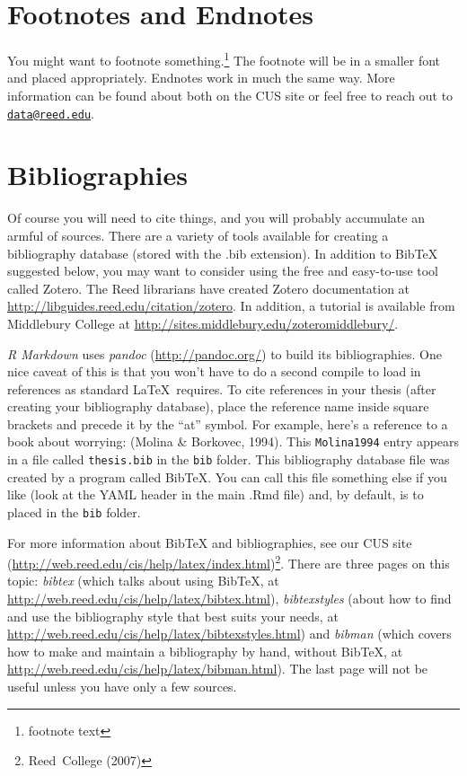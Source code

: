 \documentclass[12pt,twoside]{reedthesis}
\begin{document}
  \section{Footnotes and Endnotes}\label{footnotes-and-endnotes-2}
  
  You might want to footnote something.\footnote{footnote text} The
  footnote will be in a smaller font and placed appropriately. Endnotes
  work in much the same way. More information can be found about both on
  the CUS site or feel free to reach out to
  \href{mailto:data@reed.edu}{\nolinkurl{data@reed.edu}}.
  
  \section{Bibliographies}\label{bibliographies-2}
  
  Of course you will need to cite things, and you will probably accumulate
  an armful of sources. There are a variety of tools available for
  creating a bibliography database (stored with the .bib extension). In
  addition to BibTeX suggested below, you may want to consider using the
  free and easy-to-use tool called Zotero. The Reed librarians have
  created Zotero documentation at
  \url{http://libguides.reed.edu/citation/zotero}. In addition, a tutorial
  is available from Middlebury College at
  \url{http://sites.middlebury.edu/zoteromiddlebury/}.
  
  \emph{R Markdown} uses \emph{pandoc} (\url{http://pandoc.org/}) to build
  its bibliographies. One nice caveat of this is that you won't have to do
  a second compile to load in references as standard \LaTeX~requires. To
  cite references in your thesis (after creating your bibliography
  database), place the reference name inside square brackets and precede
  it by the ``at'' symbol. For example, here's a reference to a book about
  worrying: (Molina \& Borkovec, 1994). This \texttt{Molina1994} entry
  appears in a file called \texttt{thesis.bib} in the \texttt{bib} folder.
  This bibliography database file was created by a program called BibTeX.
  You can call this file something else if you like (look at the YAML
  header in the main .Rmd file) and, by default, is to placed in the
  \texttt{bib} folder.
  
  For more information about BibTeX and bibliographies, see our CUS site
  (\url{http://web.reed.edu/cis/help/latex/index.html})\footnote{Reed~College
    (2007)}. There are three pages on this topic: \emph{bibtex} (which
  talks about using BibTeX, at
  \url{http://web.reed.edu/cis/help/latex/bibtex.html}),
  \emph{bibtexstyles} (about how to find and use the bibliography style
  that best suits your needs, at
  \url{http://web.reed.edu/cis/help/latex/bibtexstyles.html}) and
  \emph{bibman} (which covers how to make and maintain a bibliography by
  hand, without BibTeX, at
  \url{http://web.reed.edu/cis/help/latex/bibman.html}). The last page
  will not be useful unless you have only a few sources.
  
\end{document}
